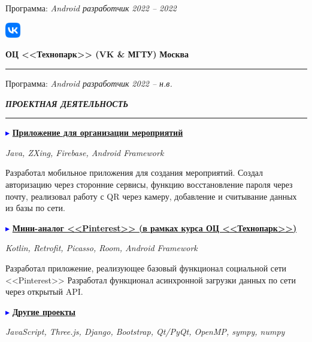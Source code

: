 \documentclass[a4paper, 10pt]{extarticle}
\newcommand{\Sep}{
    \noindent\hdashrule[0.5ex]{\columnwidth}{1pt}{1mm 1pt}
}
\begin{document}
\begin{paracol}{2}
\begin{rightcolumn}
{                Программа: \textit{Android разработчик}
                \hfill \textit{2022 -- 2022} 
            }
            \vspace{1em}

            \noindent\parbox{0.1\columnwidth}{
                \includegraphics[width=0.05\textwidth]{img/vk_logo.png}
            }
            \parbox{0.89\columnwidth}{
                \textbf{ОЦ <<Технопарк>> (VK \& МГТУ)}
                \hfill \textbf{Москва}
                \hrule
                \vspace{0.5em}

                Программа: \textit{Android разработчик}
                \hfill \textit{2022 -- н.в.} 
            }
            \vspace{-1.1em}

            \Sep
            \begin{center}
                \textbf{\textit{ПРОЕКТНАЯ ДЕЯТЕЛЬНОСТЬ}}
                \vspace{-1.25em}

                \rule{5em}{1pt}
            \end{center}
            \vspace{-1em}
            \textcolor{blue}{$\blacktriangleright$} 
            \textbf{\underline{Приложение для организации мероприятий}}
            
            \noindent\textit{Java, ZXing, Firebase, Android Framework}
            
            \noindent Разработал мобильное приложения для создания мероприятий.
            Создал авторизацию через сторонние сервисы, функцию восстановление пароля через почту,
            реализовал работу с QR через камеру, добавление и считывание данных из базы по сети.
            
            \noindent\textcolor{blue}{$\blacktriangleright$} 
            \textbf{\underline{Мини-аналог <<Pinterest>> (в рамках курса ОЦ <<Технопарк>>)}}
            
            \noindent\textit{Kotlin, Retrofit, Picasso, Room, Android Framework}
            
            \noindent Разработал приложение, реализующее базовый функционал социальной сети <<Pinterest>>
            Разработал функционал асинхронной загрузки данных по сети через открытый API.

            \noindent\textcolor{blue}{$\blacktriangleright$}
            \noindent\textbf{\underline{Другие проекты}}

            \noindent\textit{JavaScript, Three.js, Django, Bootstrap, Qt/PyQt, OpenMP, sympy, numpy}
        \end{rightcolumn}
    \end{paracol}
\end{document}

